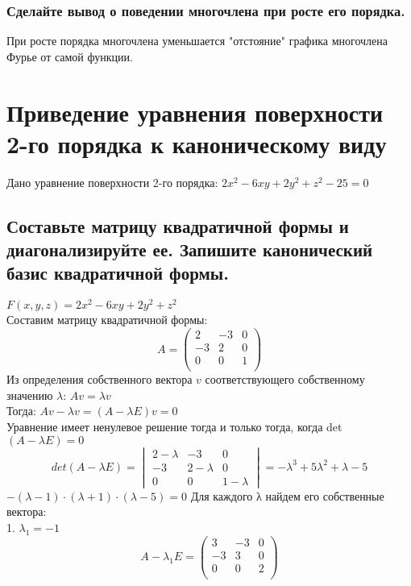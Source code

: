 \documentclass{article}
\begin{document}
    \subsubsection{Сделайте вывод о поведении многочлена при росте его порядка.}
    При росте порядка многочлена уменьшается "отстояние" \;графика многочлена Фурье от самой функции.
    
    
    
    

    
\newpage
    \section{Приведение уравнения поверхности 2-го порядка к каноническому виду}
    Дано уравнение поверхности 2-го порядка: $2x^2 - 6xy + 2y^2 + z^2 - 25 = 0$
    \subsection{Составьте матрицу квадратичной формы и диагонализируйте ее. Запишите канонический базис
    квадратичной формы.}
    $F(x, y, z) = 2x^2 -6xy + 2y^2 + z^2$ \\
    Составим матрицу квадратичной формы: \\
    \begin{equation*}
    A = 
        \begin{pmatrix}
            2& -3& 0\\
            -3& 2& 0\\
            0& 0& 1\\
        \end{pmatrix}
    \end{equation*}
    Из определения собственного вектора $v$ соответствующего собственному значению $\lambda$: $A v=\lambda v$ \\
    Тогда: $A v-\lambda v=(A-\lambda E) v=0$\\
    Уравнение имеет ненулевое решение тогда и только тогда, когда
    det$(A-\lambda E) = 0$
    \[
    det(A-\lambda E) =
    \begin{vmatrix}
    2-\lambda & -3 & 0 \\
    -3 & 2-\lambda & 0 \\
    0 & 0 & 1-\lambda
    \end{vmatrix}
     = -\lambda^3 +5 \lambda^2 + \lambda -5 
    \]
    $- (\lambda-1) \cdot (\lambda+1) \cdot (\lambda-5) = 0$
    Для каждого λ найдем его собственные вектора: \\
    1. $\lambda_1 = -1$
    \begin{equation*}
    A -\lambda_1 E = 
        \begin{pmatrix}
            3& -3& 0 \\
            -3& 3& 0 \\
            0& 0& 2 \\
        \end{pmatrix}
    \end{equation*}
\end{document}
